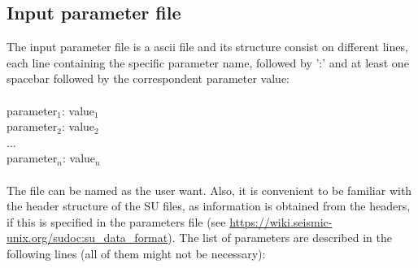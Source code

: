 \documentclass[11pt, oneside]{article}   	%
\begin{document}
\subsection{Input parameter file}\label{sec4a}
The input parameter file is a ascii file and its structure consist on different lines, each line containing the specific parameter name, followed by ':' and at least one spacebar followed by the correspondent parameter value: \\ \\
 {parameter$_1$:  value$_1$} \\
 {parameter$_2$:  value$_2$} \\
 ... \\
 {parameter$_n$:  value$_n$}\\ 
 \\
The file can be named as the user want. Also, it is convenient to be familiar with the header structure of the SU files, as information is obtained from the headers, if this is specified in the parameters file (see \url{https://wiki.seismic-unix.org/sudoc:su_data_format}). The list of parameters are described in the following lines (all of them might not be necessary):
\end{document}
